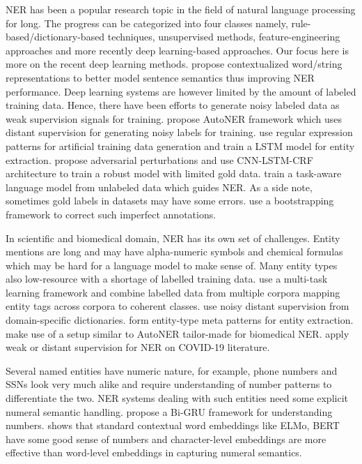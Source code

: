 NER has been a popular research topic in the field of natural language processing for long. The progress can be categorized into four classes namely, rule-based/dictionary-based techniques\cite{quimbaya2016named}, unsupervised methods\cite{zhang2013unsupervised}, feature-engineering approaches\cite{mcnamee2002entity} and more recently deep learning-based approaches\cite{torfi2020natural, li2020survey}. Our focus here is more on the recent deep learning methods. \cite{devlin2018bert, peters2018deep, akbik2018contextual} propose contextualized word/string representations to better model sentence semantics thus improving NER performance. Deep learning systems are however limited by the amount of labeled training data. Hence, there have been efforts to generate noisy labeled data as weak supervision signals for training. \cite{shang2018learning} propose AutoNER framework which uses distant supervision for generating noisy labels for training. \cite{arora2017extracting} use regular expression patterns for artificial training data generation and train a LSTM model for entity extraction. \cite{zhou2019dual} propose adversarial perturbations and use CNN-LSTM-CRF\cite{ma2016end} architecture to train a robust model with limited gold data. \cite{liu2018empower, liu2018efficient} train a task-aware language model from unlabeled data which guides NER. As a side note, sometimes gold labels in datasets may have some errors. \cite{wang2019crossweigh} use a bootstrapping framework to correct such imperfect annotations.

In scientific and biomedical domain, NER has its own set of challenges. Entity mentions are long and may have alpha-numeric symbols and chemical formulas which may be hard for a language model to make sense of. Many entity types also low-resource with a shortage of labelled training data. \cite{wang2019cross} use a multi-task learning framework and combine labelled data from multiple corpora mapping entity tags across corpora to coherent classes. \cite{wang2020pattern} use noisy distant supervision from domain-specific dictionaries. \cite{wang2018penner} form entity-type meta patterns for entity extraction. \cite{wang2019distantly} make use of a setup similar to AutoNER\cite{shang2018learning} tailor-made for biomedical NER. \cite{wang2020fine, wang2020comprehensive} apply weak or distant supervision for NER on COVID-19 literature.

Several named entities have numeric nature, for example, phone numbers and SSNs look very much alike and require understanding of number patterns to differentiate the two. NER systems dealing with such entities need some explicit numeral semantic handling. \cite{chen2019numeracy} propose a Bi-GRU framework for understanding numbers. \cite{wallace2019nlp} shows that standard contextual word embeddings like ELMo\cite{peters2018deep}, BERT\cite{devlin2018bert} have some good sense of numbers and character-level embeddings are more effective than word-level embeddings in capturing numeral semantics.
